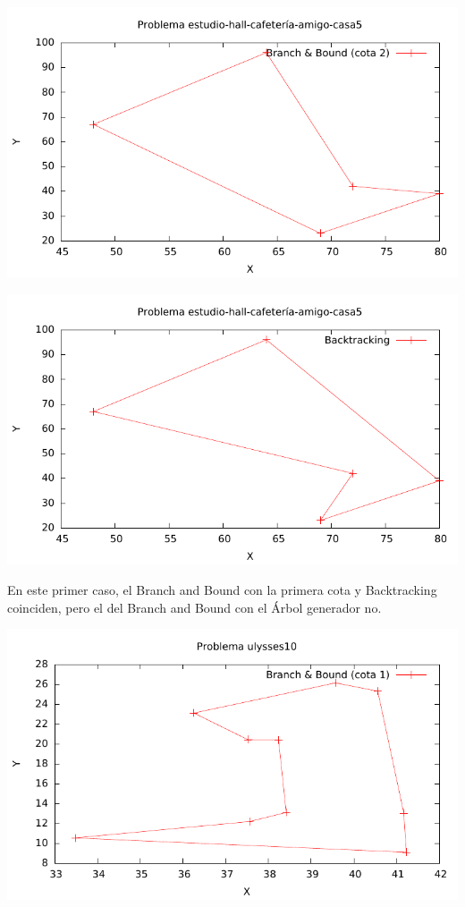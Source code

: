 \includegraphics[width=15cm]{img/e-h-c-a-c5_tsp_2}

\includegraphics[width=15cm]{img/e-h-c-a-c5_tsp_3}

En este primer caso, el Branch and Bound con la primera cota y Backtracking coinciden, pero el del Branch and Bound con el Árbol generador no.

\includegraphics[width=15cm]{img/ulysses10_tsp_1}

